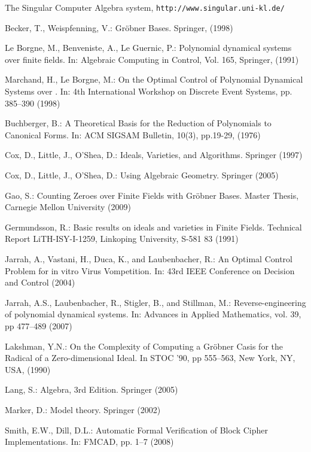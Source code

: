 \documentclass[envcountsect]{llncs}
\begin{document}
{{\begin{thebibliography}{20}
 The Singular Computer Algebra system, {\tt http://www.singular.uni-kl.de/}

 {Becker, T., Weispfenning, V.}: {Gr\"obner Bases}. Springer, (1998)

 {Le Borgne, M., Benveniste, A., Le Guernic, P.}: {Polynomial dynamical systems over finite fields}. In: {Algebraic Computing in Control}, Vol. 165, Springer, (1991)


 Marchand, H., Le Borgne, M.: On the Optimal Control of Polynomial Dynamical Systems over . In: 4th International Workshop on Discrete Event Systems, pp. {385--390} (1998)


 Buchberger, B.: A Theoretical Basis for the Reduction of Polynomials to Canonical
Forms. In: ACM SIGSAM Bulletin, 10(3), pp.19-29, (1976)

 Cox, D., Little, J., O'Shea, D.: Ideals, Varieties, and Algorithms. Springer (1997)

 Cox, D., Little, J., O'Shea, D.: Using Algebraic Geometry. Springer (2005)

 Gao, S.: Counting Zeroes over Finite Fields with Gr\"obner Bases. Master Thesis, Carnegie Mellon University (2009)

 Germundsson, R.: Basic results on ideals and varieties in Finite Fields. Technical
Report LiTH-ISY-I-1259, Linkoping University, S-581 83 (1991)

 Jarrah, A., Vastani, H., Duca, K., and Laubenbacher, R.: An Optimal Control Problem
for in vitro Virus Vompetition. In: 43rd IEEE Conference on Decision and Control (2004)

 Jarrah, A.S., Laubenbacher, R., Stigler, B., and Stillman, M.: Reverse-engineering of
polynomial dynamical systems. In: Advances in Applied Mathematics, vol. 39, pp 477--489 (2007)

 Lakshman, Y.N.: On the Complexity of Computing a Gr\"obner Casis for the Radical
of a Zero-dimensional Ideal. In STOC '90, pp 555--563, New York, NY, USA, (1990)

 Lang, S.: Algebra, 3rd Edition. Springer (2005)

 Marker, D.: Model theory. Springer (2002)

 Smith, E.W., Dill, D.L.: Automatic Formal Verification of Block Cipher Implementations.
In: FMCAD, pp. 1--7 (2008)


\end{thebibliography}}}
\end{document}
